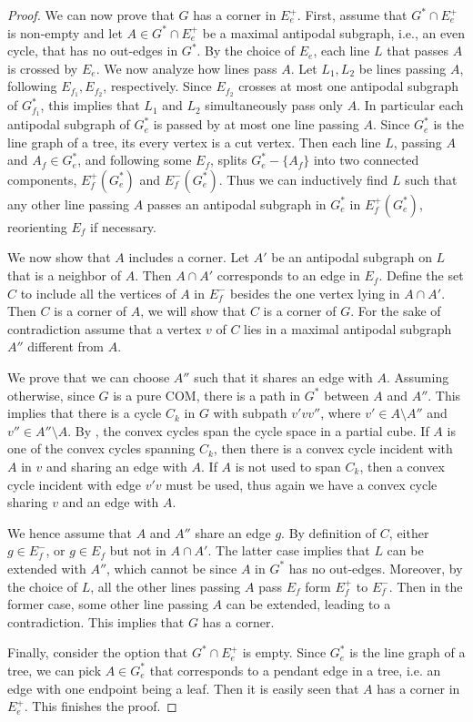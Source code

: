 \documentclass[final,11pt]{article}
\begin{document}
\begin{proof}
We can now prove that $G$ has a corner in $E_e^+$. First, assume that  $G^* \cap E_e^+$ is non-empty and let $A \in G^* \cap E_e^+$ be a maximal antipodal subgraph, i.e., an even cycle, that has no out-edges in $G^*$. By the choice of $E_e$, each line $L$ that passes $A$ is crossed by $E_e$. We now analyze how lines pass $A$. Let $L_1, L_2$ be lines passing $A$, following  $E_{f_1},  E_{f_2}$, respectively. Since  $E_{f_2}$ crosses at most one antipodal subgraph of $G_{f_1}^*$, this implies that  $L_1$ and $L_2$ simultaneously pass only $A$. In particular each antipodal subgraph of $G^*_e$ is passed by at most one line passing $A$. Since  $G^*_e$ is the line graph of a tree, its every vertex is a cut vertex. Then each line $L$, passing $A$ and $A_f \in G_e^*$, and following some $E_{f}$, splits $G_e^* - \{A_f\}$ into two connected components, $E_f^+(G_e^*)$ and $E_f^-(G_e^*)$. Thus we can inductively find $L$ such that any other line passing $A$ passes an antipodal subgraph in $G_e^*$ in $E_f^+(G_e^*)$, reorienting $E_f$ if necessary. 

We now show that $A$ includes a corner. Let $A'$ be an antipodal subgraph on $L$ that is a neighbor of $A$. Then $A\cap A'$ corresponds to an edge in $E_f$. Define the set $C$ to include all the vertices of $A$ in $E_f^-$ besides the one vertex lying in $A\cap A'$. Then $C$ is a corner of $A$, we will show that $C$ is a corner of $G$. For the sake of contradiction assume that a vertex $v$ of $C$ lies in a maximal antipodal subgraph $A''$ different from $A$.

We prove that we can choose  $A''$ such that it shares an edge with $A$. Assuming otherwise, since $G$ is a pure COM, there is a path in $G^*$ between $A$ and $A''$. This implies that there is a cycle $C_k$ in $G$ with subpath $v'vv''$, where $v'\in A\setminus A''$ and $v'' \in A''\setminus A$. By \cite[Lemma 13]{Che-16}, the convex cycles span the cycle space in a partial cube. If $A$ is one of the convex cycles spanning $C_k$, then there is a convex cycle incident with $A$ in $v$ and sharing an edge with $A$. If $A$ is not used to span $C_k$, then a convex cycle incident with edge $v'v$ must be used, thus again we have a convex cycle sharing $v$ and an edge with $A$.

We hence assume that $A$ and $A''$ share an edge $g$. By definition of $C$, either $g \in E_f^{-}$, or $g\in E_f$ but not in $A\cap A'$. The latter case implies that $L$ can be extended with $A''$, which cannot be since $A$ in $G^*$ has no out-edges. Moreover, by the choice of $L$, all the other lines passing $A$ pass $E_f$ form $E_f^+$ to $E_f^-$. Then in the former case, some other line passing $A$ can be extended, leading to a contradiction. This implies that $G$ has a corner. 

Finally, consider the option that $G^* \cap E_e^+$ is empty. Since $G_e^*$ is the line graph of a tree, we can pick $A\in G_e^*$ that corresponds to a pendant edge in a tree, i.e. an edge with one endpoint being a leaf. Then it is easily seen that $A$ has a corner in $E_e^+$. This finishes the proof.
\end{proof}
\end{document}
